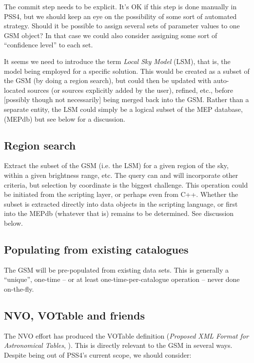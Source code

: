 \documentclass[]{lofar}
\begin{document}
  The commit step needs to be explicit. It's OK if this step is done manually
  in PSS4, but we should keep an eye on the possibility of some sort of
  automated strategy. Should it be possible to assign several sets of parameter
  values to one GSM object? In that case we could also consider assigning some
  sort of ``confidence level'' to each set.

  It seems we need to introduce the term {\em Local Sky Model} (LSM), that is,
  the model being employed for a specific solution. This would be created as a
  subset of the GSM (by doing a region search), but could then be updated with
  auto-located sources (or sources explicitly added by the user), refined,
  etc., before [possibly though not necessarily] being merged back into the
  GSM. Rather than a separate entity, the LSM could simply be a logical subset
  of the MEP database, (MEPdb) but see below for a discussion.

\subsection{Region search}
  
  Extract the subset of the GSM (i.e. the LSM) for a given region of the sky,
  within a given brightness range, etc. The query can and will incorporate
  other criteria, but selection by coordinate is the biggest challenge. This
  operation could be initiated from the scripting layer, or perhaps even from
  C++. Whether the subset is extracted directly into data objects in the
  scripting language, or first into the MEPdb (whatever that is) remains to be
  determined. See discussion below.

\subsection{Populating from existing catalogues}
  
  The GSM will be pre-populated from existing data sets. This is generally a
  ``unique'', one-time -- or at least one-time-per-catalogue operation -- never
  done on-the-fly.
  
\subsection{NVO, VOTable and friends}
  
  The NVO effort has produced the VOTable definition ({\em Proposed XML Format
  for Astronomical Tables}, \cite{VOT}). This is directly relevant to the GSM in
  several ways. Despite being out of PSS4's current scope, we should consider:
  
\end{document}
